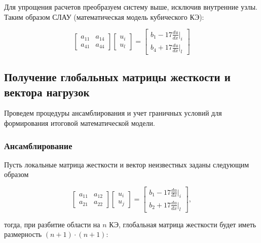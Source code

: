 Для упрощения расчетов преобразуем систему выше, исключив внутренние узлы. Таким образом СЛАУ (математическая модель кубического КЭ):

$$ \begin{bmatrix}
a_{11}     &   a_{14}\\
a_{41}     &    a_{44}
\end{bmatrix}
\begin{bmatrix}
u_i \\
u_l
\end{bmatrix} =
\begin{bmatrix}
b_1   -17  \frac{du}{dx}|_i \\
b_4   +17  \frac{du}{dx}|_l
\end{bmatrix}$$

\subsection{Получение глобальных матрицы жесткости и вектора нагрузок}

Проведем процедуры ансамблирования и учет граничных условий для формирования итоговой математической модели.

\subsubsection{Ансамблирование}

Пусть локальные матрица жесткости и вектор неизвестных заданы следующим образом

$$
\begin{bmatrix}
a_{11}     &   a_{12}\\
a_{21}     &    a_{22}
\end{bmatrix}
\begin{bmatrix}
u_i \\
u_j
\end{bmatrix} =
\begin{bmatrix}
b_1   -17  \frac{du}{dx}|_i \\
b_2   +17  \frac{du}{dx}|_l
\end{bmatrix},$$

тогда, при разбитие области на $n$ КЭ, глобальная матрица жесткости  будет иметь размерность $(n+1)\cdot(n+1)$:

